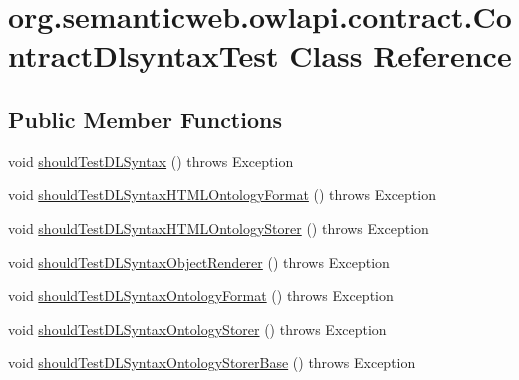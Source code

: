 \hypertarget{classorg_1_1semanticweb_1_1owlapi_1_1contract_1_1_contract_dlsyntax_test}{\section{org.\-semanticweb.\-owlapi.\-contract.\-Contract\-Dlsyntax\-Test Class Reference}
\label{classorg_1_1semanticweb_1_1owlapi_1_1contract_1_1_contract_dlsyntax_test}
}
\subsection*{Public Member Functions}
\begin{DoxyCompactItemize}
\item 
void \hyperlink{classorg_1_1semanticweb_1_1owlapi_1_1contract_1_1_contract_dlsyntax_test_ae00efdc96a0105730a0215d1dff7f316}{should\-Test\-D\-L\-Syntax} ()  throws Exception 
\item 
void \hyperlink{classorg_1_1semanticweb_1_1owlapi_1_1contract_1_1_contract_dlsyntax_test_aa1920a889b923a7c8c797ad86aa56663}{should\-Test\-D\-L\-Syntax\-H\-T\-M\-L\-Ontology\-Format} ()  throws Exception 
\item 
void \hyperlink{classorg_1_1semanticweb_1_1owlapi_1_1contract_1_1_contract_dlsyntax_test_a7cb5aa6abdf5d2b34c0e692f1ae618bb}{should\-Test\-D\-L\-Syntax\-H\-T\-M\-L\-Ontology\-Storer} ()  throws Exception 
\item 
void \hyperlink{classorg_1_1semanticweb_1_1owlapi_1_1contract_1_1_contract_dlsyntax_test_aaca6f9a043cb891818b3e6eaeb57cda1}{should\-Test\-D\-L\-Syntax\-Object\-Renderer} ()  throws Exception 
\item 
void \hyperlink{classorg_1_1semanticweb_1_1owlapi_1_1contract_1_1_contract_dlsyntax_test_ad127293b2c28b37880ebeabbb005762d}{should\-Test\-D\-L\-Syntax\-Ontology\-Format} ()  throws Exception 
\item 
void \hyperlink{classorg_1_1semanticweb_1_1owlapi_1_1contract_1_1_contract_dlsyntax_test_a04298d969a7bcd8422f422f5387e0423}{should\-Test\-D\-L\-Syntax\-Ontology\-Storer} ()  throws Exception 
\item 
void \hyperlink{classorg_1_1semanticweb_1_1owlapi_1_1contract_1_1_contract_dlsyntax_test_a3f58067811bbaaee1972538a7fc4b143}{should\-Test\-D\-L\-Syntax\-Ontology\-Storer\-Base} ()  throws Exception 
\end{DoxyCompactItemize}


